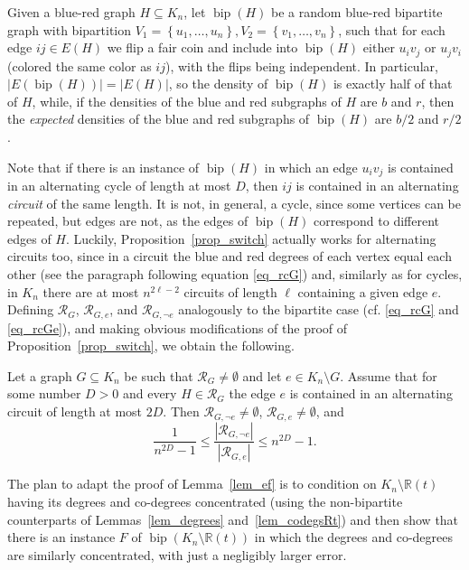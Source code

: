\documentclass[12pt,reqno]{amsart}
\newcommand{\rc}{{\mathcal{R}}}
\newcommand{\R} {\mathbb R}
\newcommand{\bip}{\operatorname{bip}}
\theoremstyle{definition}
\newenvironment{manualprop}[1]{%
  \renewcommand\themanualpropinner{#1}%
  \manualpropinner
}
{
\endmanualpropinner
}
\begin{document}
Given a blue-red graph $H \subseteq K_n$, let $\bip(H)$ be a random blue-red bipartite graph with bipartition $V_1 = \left\{ u_1, \dots, u_n \right\}, V_2 = \left\{ v_1, \dots, v_n \right\}$, such that for each edge $ij \in E(H)$ we flip a fair coin and include into $\bip(H)$ either $u_iv_j$ or $u_jv_i$ (colored the same color as $ij$), with the flips being independent. In particular, $|E(\bip(H))| = |E(H)|$, so the density of $\bip(H)$ is exactly half of that of $H$, while, if the densities of the blue and red subgraphs of $H$ are $b$ and $r$, then the \emph{expected} densities of the blue and red subgraphs of $\bip(H)$ are $b/2$ and $r/2$.

Note that if there is an instance of $\bip(H)$ in which an edge $u_iv_j$ is contained in an alternating cycle of length at most $D$, then $ij$ is contained in an alternating \emph{circuit} of the same length. It is not, in general, a cycle, since some vertices can be repeated, but edges are not, as the edges of $\bip(H)$ correspond to different edges of $H$. Luckily, Proposition~\ref{prop_switch} actually works  for alternating circuits too, since in a circuit the blue and red degrees of each vertex equal each other (see the paragraph following equation \eqref{eq_rcG}) and, similarly as for cycles, in $K_n$ there are at most $n^{2\ell-2}$ circuits of length $\ell$ containing a given edge $e$. Defining $\rc_G$, $\rc_{G,e}$, and $ \rc_{G,\neg e}$ analogously to the bipartite case (cf. \eqref{eq_rcG} and \eqref{eq_rcGe}), and making obvious modifications of the proof of Proposition~\ref{prop_switch}, we obtain the following.
\begin{manualprop}{\ref{prop_switch}$'$}
  \label{prop4_nonbip}
  Let a graph $G\subseteq K_n$ be such that $\rc_G\neq\emptyset$ and let $e\in K_n\setminus G$. Assume that for some number $D > 0$ and every $H\in \rc_{G}$ the edge $e$ is contained in an alternating circuit of length at most $2D$. Then $\rc_{G,\neg e}\neq\emptyset$, $\rc_{G, e}\neq\emptyset$, and
	\[
		\frac{1}{n^{2D} - 1} \le \frac{|\rc_{G,\neg e}|}{|\rc_{G,e}|} \le n^{2D} - 1.
	\]
\end{manualprop}

The plan to adapt the proof of Lemma~\ref{lem_ef} is to condition on $K_n\setminus\R(t)$ having its degrees and co-degrees concentrated (using the non-bipartite counterparts of Lemmas~\ref{lem_degrees} and~\ref{lem_codegsRt}) and then show that there is an instance $F$ of $\bip(K_n \setminus \R(t))$ in which the degrees and co-degrees are similarly concentrated, with just a negligibly larger error.
\end{document}
